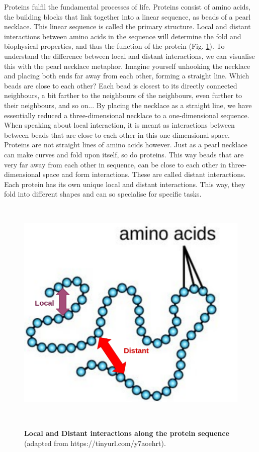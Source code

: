 Proteins fulfil the fundamental processes of life. 
Proteins consist of amino acids,
the building blocks that link together into a linear sequence, 
as beads of a pearl necklace.
This linear sequence is called the primary structure. 
Local and distant interactions between amino acids in the sequence will determine the fold and biophysical properties, 
and thus the function of the protein (Fig. \ref{fig:local_distant}).
To understand the difference between local and distant interactions,
we can visualise this  with the pearl necklace metaphor.
Imagine yourself unhooking the necklace and placing both ends far away from each other, forming a straight line.
Which beads are close to each other? 
Each bead is closest to its directly connected neighbours, 
a bit farther to the neighbours of the neighbours,
even further to their neighbours, and so on...
By placing the necklace as a straight line,
we have essentially reduced a three-dimensional necklace to a one-dimensional sequence.
When speaking about local interaction, 
it is meant as interactions between between beads that are close to each other in this one-dimensional space.
Proteins are not straight lines of amino acids however.
Just as a pearl necklace can make curves and fold upon itself, 
so do proteins.
This way beads that are very far away from each other in sequence,
can be close to each other in three-dimensional space and form interactions.
These are called distant interactions.
Each protein has its own unique local and distant interactions.
This way, 
they fold into different shapes and can so specialise for specific tasks.

~\begin{figure}[h!]
	\centering
	\includegraphics[width=0.6\linewidth]{./literature_review/proteins/img/local_distant.png}
	\caption{
		\textbf{Local and Distant interactions along the protein sequence}
		(adapted from https://tinyurl.com/y7aoehrt).
	}
	\label{fig:local_distant}
~\end{figure}
